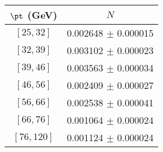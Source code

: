 \begin{tabular}{c||c}
$\pt$ (GeV) & $N$  \\
\hline
$[25, 32]$ & 0.002648 $\pm$ 0.000015\\
$[32, 39]$ & 0.003102 $\pm$ 0.000023\\
$[39, 46]$ & 0.003563 $\pm$ 0.000034\\
$[46, 56]$ & 0.002409 $\pm$ 0.000027\\
$[56, 66]$ & 0.002538 $\pm$ 0.000041\\
$[66, 76]$ & 0.001064 $\pm$ 0.000024\\
$[76, 120]$ & 0.001124 $\pm$ 0.000024\\
\end{tabular}
